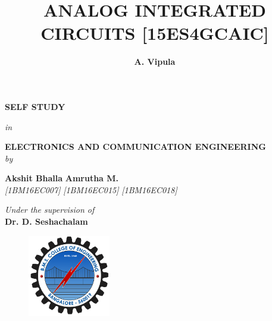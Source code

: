 \title{\fontsize{14pt}{16.8pt}\selectfont\bf{ANALOG INTEGRATED CIRCUITS [15ES4GCAIC]}}
\date{}

\maketitle
\thispagestyle{empty}

\begin{center}
\vspace*{-15mm}

{\fontsize{14pt}{16.8pt}\selectfont\textbf{SELF STUDY}} \\
\vspace*{4mm}

{\fontsize{14pt}{16.8pt}\selectfont\textit{in}} \\
\vspace*{3mm}

{\fontsize{14pt}{16.8pt}\selectfont\textbf{ELECTRONICS AND COMMUNICATION ENGINEERING}} \\

\vspace*{4mm}
{\fontsize{14pt}{16.8pt}\selectfont\textit{by}} \\
\vspace*{5mm}

\author{\fontsize{14pt}{16.8pt}\selectfont\textbf{A. Vipula}}  \hspace*{12mm} {\fontsize{14pt}{16.8pt}\selectfont\textbf{Akshit Bhalla}} \hspace*{12mm} {\fontsize{14pt}{16.8pt}\selectfont\textbf{Amrutha M.}}\\
\vspace*{2mm}
{\fontsize{12pt}{14.4pt}\selectfont\textit{[1BM16EC007]} \hspace*{12mm} \selectfont\textit{[1BM16EC015]} \hspace*{12mm} \selectfont\textit{[1BM16EC018]} } \\



\vspace*{3mm}

\vspace*{4mm}\fontsize{14pt}{16.8pt}\selectfont\textit{Under the supervision of} \\
\vspace*{2mm}\fontsize{14pt}{16.8pt}\selectfont\textbf{Dr. D. Seshachalam} \\
\vspace*{8mm}

\begin{figure}[!ht]
\centering
  \includegraphics[height=36mm,width=36mm]{assets/BMSCE_Logo.png}
\end{figure}


\end{center}
